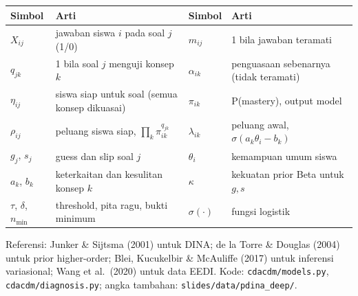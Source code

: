 \documentclass[11pt,a4paper]{article}
\newcommand{\sumber}[1]{{\footnotesize\color{midgray}#1}}
\begin{document}
\begin{table}[h]
  \centering\small
  \begin{tabularx}{\linewidth}{@{}l L l L@{}}
    \toprule
    Simbol & Arti & Simbol & Arti \\
    \midrule
    $X_{ij}$ & jawaban siswa $i$ pada soal $j$ (1/0) & $m_{ij}$ & 1 bila jawaban teramati \\
    $q_{jk}$ & 1 bila soal $j$ menguji konsep $k$ & $\alpha_{ik}$ & penguasaan sebenarnya (tidak teramati) \\
    $\eta_{ij}$ & siswa siap untuk soal (semua konsep dikuasai) & $\pi_{ik}$ & P(mastery), output model \\
    $\rho_{ij}$ & peluang siswa siap, $\prod_k\pi_{ik}^{q_{jk}}$ & $\lambda_{ik}$ & peluang awal, $\sigma(a_k\theta_i-b_k)$ \\
    $g_j$, $s_j$ & guess dan slip soal $j$ & $\theta_i$ & kemampuan umum siswa \\
    $a_k$, $b_k$ & keterkaitan dan kesulitan konsep $k$ & $\kappa$ & kekuatan prior Beta untuk $g,s$ \\
    $\tau$, $\delta$, $n_{\min}$ & threshold, pita ragu, bukti minimum & $\sigma(\cdot)$ & fungsi logistik \\
    \bottomrule
  \end{tabularx}
\end{table}

\sumber{Referensi: Junker \& Sijtsma (2001) untuk DINA; de la Torre \& Douglas (2004) untuk prior higher-order; Blei,
Kucukelbir \& McAuliffe (2017) untuk inferensi variasional; Wang et al.\ (2020) untuk data EEDI. Kode:
\texttt{cdacdm/models.py}, \texttt{cdacdm/diagnosis.py}; angka tambahan: \texttt{slides/data/pdina\_deep/}.}
\end{document}
